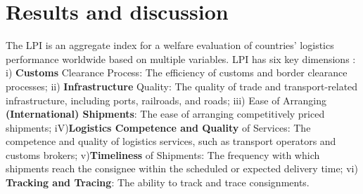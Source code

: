 \documentclass[a4paper,11pt,twoside]{article}
\begin{document}
\section{Results and discussion}

The LPI \cite{worldbank2024} is an aggregate index for a welfare evaluation of countries' logistics performance worldwide based on multiple variables. 
LPI has six key dimensions \cite{WBreport2016,WBreport2018}:
%
i) \textbf{Customs} Clearance Process: The efficiency of customs and border clearance processes; 
ii) \textbf{Infrastructure} Quality: The quality of trade and transport-related infrastructure, including ports, railroads, and roads;
iii) Ease of Arranging \textbf{(International) Shipments}: The ease of arranging competitively priced shipments;
iV)\textbf{Logistics Competence and Quality } of Services: The competence and quality of logistics services, such as transport operators and customs brokers;
v)\textbf{Timeliness} of Shipments: The frequency with which shipments reach the consignee within the scheduled or expected delivery time;
vi) \textbf{Tracking and Tracing}: The ability to track and trace consignments.

\end{document}
